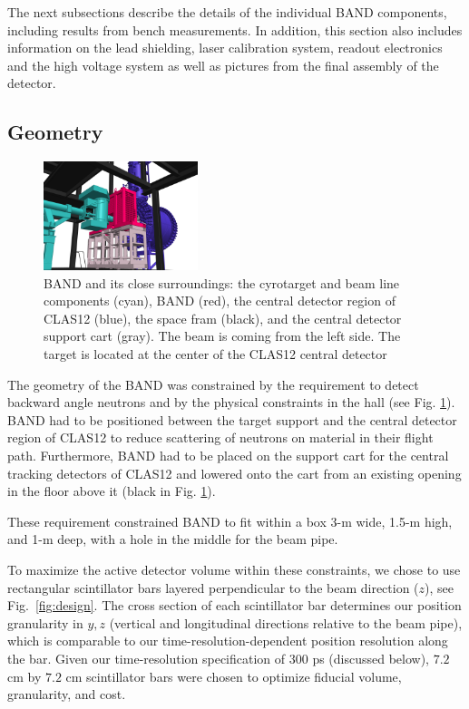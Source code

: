 \documentclass[3p,final,twocolumn]{elsarticle}
\begin{document}
The next subsections describe the details of the individual BAND components,
including results from bench measurements. In addition,
this section also includes information on the lead shielding, laser
calibration system, readout electronics and the high voltage system as
well as pictures from the final assembly of the detector.


\subsection{Geometry}
\begin{figure}[tb]
	\centering
		\includegraphics[width=0.40\textwidth]{FULL_CONTEXT_STUDIE_3.png}
		\vspace{0.5cm}
	    \caption{BAND and its close surroundings: the
                  cyrotarget and beam line components (cyan),  BAND
                  (red), the central detector region of CLAS12
                  (blue), the space fram (black), and the central detector support cart (gray). The beam is coming from the left side. The
                  target is located at the center of the CLAS12 central detector}
		\label{fig:bandtarget}
		
\end{figure}

The geometry of the BAND was constrained by the requirement to detect
backward angle neutrons and by the physical constraints in the hall (see 
Fig. \ref{fig:bandtarget}). BAND had to be positioned between the
target support and the central detector region of CLAS12 to reduce
scattering of neutrons on material in their flight path. Furthermore,
BAND had to be placed on the support cart for the central tracking
detectors of CLAS12 and lowered
onto the cart from an existing opening in the floor above it (black in Fig. \ref{fig:bandtarget}).

These requirement constrained BAND to fit within a
box 3-\si{\meter} wide, 1.5-\si{\meter} high, and 1-\si{\meter}
deep, with a hole in the middle for the beam pipe.

To maximize the active detector volume within these constraints, we
chose to use rectangular scintillator bars layered perpendicular to
the beam direction ($z$), see Fig.~\ref{fig:design}.  The cross
section of each scintillator bar determines our position granularity
in $y,z$ (vertical and longitudinal directions relative to the beam
pipe), which is comparable to our time-resolution-dependent position
resolution along the bar. Given our time-resolution specification of
$300$ \si{\pico\second} (discussed below), $7.2$
\si{\centi\meter} by $7.2$ \si{\centi\meter} scintillator bars were
chosen to optimize fiducial volume, granularity, and cost.
\end{document}
